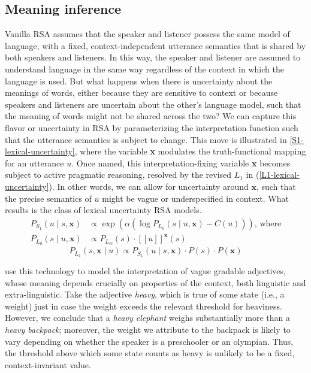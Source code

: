 \documentclass{sp}
\newcommand{\sem}[1]{\ensuremath{[\![#1]\!]}}
\begin{document}
\subsection{Meaning inference} \label{meaning-inference}

Vanilla RSA assumes that the speaker and listener possess the same model of language, with a fixed, context-independent utterance semantics that is shared by both speakers and listeners. In this way, the speaker and listener are assumed to understand language in the same way regardless of the context in which the language is used. But what happens when there is uncertainty about the meanings of words, either because they are sensitive to context or because speakers and listeners are uncertain about the other's language model, such that the meaning of words might not be shared across the two? We can capture this flavor or uncertainty in RSA by parameterizing the interpretation function such that the utterance semantics is subject to change. This move is illustrated in \eqref{S1-lexical-uncertainty}, where the variable \textbf{x} modulates the truth-functional mapping for an utterance $u$. Once named, this interpretation-fixing variable \textbf{x} becomes subject to active pragmatic reasoning, resolved by the revised $L_1$ in (\ref{L1-lexical-uncertainty}). In other words, we can allow for uncertainty around $\textbf{x}$, such that the precise semantics of $u$ might be vague or underspecified in context. What results is the class of lexical uncertainty RSA models. 
\begin{align} \label{S1-lexical-uncertainty}
P_{S_1}(u\mid s, \textbf{x}) & \propto \exp (\alpha (\log P_{L_0}(s\mid u, \textbf{x}) - C(u))) \text{, where} \\
  P_{L_0}(s \mid u, \textbf{x}) & \propto P_{L_O}(s)  \cdot \sem{u}^{\textbf{x}}(s) \nonumber
\end{align}
\begin{equation} \label{L1-lexical-uncertainty}
P_{L_1}(s, \textbf{x} \mid u) \propto P_{S_1}(u \mid s, \textbf{x}) \cdot P(s) \cdot P(\textbf{x})
\end{equation}

\cite{lassitergoodman2013} use this technology to model the interpretation of vague gradable adjectives, whose meaning depends crucially on properties of the context, both linguistic and extra-linguistic. Take the adjective \emph{heavy}, which is true of some state (i.e., a weight) just in case the weight exceeds the relevant threshold for heaviness. However, we conclude that a \emph{heavy elephant} weighs substantially more than a \emph{heavy backpack}; moreover, the weight we attribute to the backpack is likely to vary depending on whether the speaker is a preschooler or an olympian. Thus, the threshold above which some state counts as heavy is unlikely to be a fixed, context-invariant value.
\end{document}
